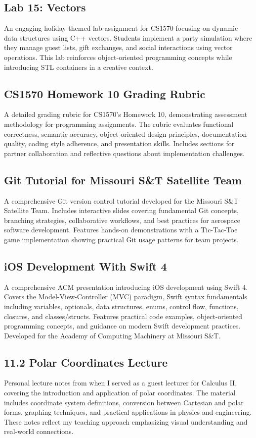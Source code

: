 \documentclass{mst}
\begin{document}
\subsection*{Lab 15: Vectors}
An engaging holiday-themed lab assignment for CS1570 focusing on dynamic data structures using C++ vectors. Students implement a party simulation where they manage guest lists, gift exchanges, and social interactions using vector operations. This lab reinforces object-oriented programming concepts while introducing STL containers in a creative context.

\subsection*{CS1570 Homework 10 Grading Rubric}
A detailed grading rubric for CS1570's Homework 10, demonstrating assessment methodology for programming assignments. The rubric evaluates functional correctness, semantic accuracy, object-oriented design principles, documentation quality, coding style adherence, and presentation skills. Includes sections for partner collaboration and reflective questions about implementation challenges.

\subsection*{Git Tutorial for Missouri S\&T Satellite Team}
A comprehensive Git version control tutorial developed for the Missouri S\&T Satellite Team. Includes interactive slides covering fundamental Git concepts, branching strategies, collaborative workflows, and best practices for aerospace software development. Features hands-on demonstrations with a Tic-Tac-Toe game implementation showing practical Git usage patterns for team projects.

\subsection*{iOS Development With Swift 4}
A comprehensive ACM presentation introducing iOS development using Swift 4. Covers the Model-View-Controller (MVC) paradigm, Swift syntax fundamentals including variables, optionals, data structures, enums, control flow, functions, closures, and classes/structs. Features practical code examples, object-oriented programming concepts, and guidance on modern Swift development practices. Developed for the Academy of Computing Machinery at Missouri S\&T.

\subsection*{11.2 Polar Coordinates Lecture}
Personal lecture notes from when I served as a guest lecturer for Calculus II, covering the introduction and application of polar coordinates. The material includes coordinate system definitions, conversion between Cartesian and polar forms, graphing techniques, and practical applications in physics and engineering. These notes reflect my teaching approach emphasizing visual understanding and real-world connections.
\end{document}
